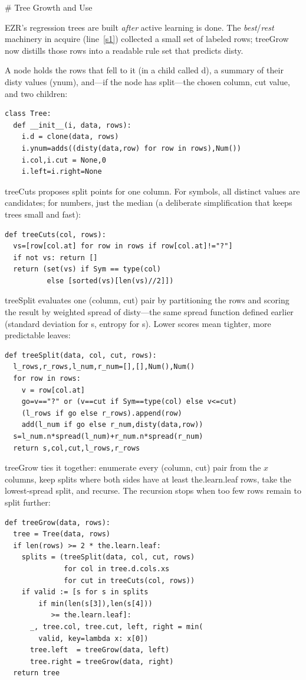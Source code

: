 # Tree Growth and Use

EZR's regression trees are built {\em after} active learning is done.
The {\em best}/{\em rest} machinery in \textsf{acquire} (line~\ref{s1})
collected a small set of labeled rows; \textsf{treeGrow} now distills
those rows into a readable rule set that predicts \textsf{disty}.

A  node holds the rows that fell to it (in a child 
called \textsf{d}), a summary  of their \textsf{disty} values
(\textsf{ynum}), and---if the node has split---the chosen column,
cut value, and two children:
\begin{verbatim}
class Tree: 
  def __init__(i, data, rows):
    i.d = clone(data, rows)
    i.ynum=adds((disty(data,row) for row in rows),Num())
    i.col,i.cut = None,0
    i.left=i.right=None
\end{verbatim}
\textsf{treeCuts} proposes split points for one column. For symbols,
all distinct values are candidates; for numbers, just the median (a
deliberate simplification that keeps trees small and fast):
\begin{verbatim}
def treeCuts(col, rows): 
  vs=[row[col.at] for row in rows if row[col.at]!="?"]
  if not vs: return []
  return (set(vs) if Sym == type(col)
          else [sorted(vs)[len(vs)//2]])
\end{verbatim}

\textsf{treeSplit} evaluates one (column, cut) pair by partitioning
the rows and scoring the result by weighted \textsf{spread} of
\textsf{disty}---the same \textsf{spread} function defined earlier
(standard deviation for s, entropy for s). Lower
scores mean tighter, more predictable leaves:
\begin{verbatim}
def treeSplit(data, col, cut, rows): 
  l_rows,r_rows,l_num,r_num=[],[],Num(),Num()
  for row in rows:
    v = row[col.at]
    go=v=="?" or (v==cut if Sym==type(col) else v<=cut)
    (l_rows if go else r_rows).append(row)
    add(l_num if go else r_num,disty(data,row))
  s=l_num.n*spread(l_num)+r_num.n*spread(r_num)
  return s,col,cut,l_rows,r_rows
\end{verbatim}

\textsf{treeGrow} ties it together: enumerate every (column, cut)
pair from the $x$ columns, keep splits where both sides have at
least \textsf{the.learn.leaf} rows, take the lowest-spread split,
and recurse. The recursion stops when too few rows remain to split
further:
\begin{verbatim}
def treeGrow(data, rows): 
  tree = Tree(data, rows)
  if len(rows) >= 2 * the.learn.leaf:
    splits = (treeSplit(data, col, cut, rows)
              for col in tree.d.cols.xs
              for cut in treeCuts(col, rows))
    if valid := [s for s in splits
        if min(len(s[3]),len(s[4]))
           >= the.learn.leaf]:
      _, tree.col, tree.cut, left, right = min(
        valid, key=lambda x: x[0])
      tree.left  = treeGrow(data, left)
      tree.right = treeGrow(data, right)
  return tree
\end{verbatim}

